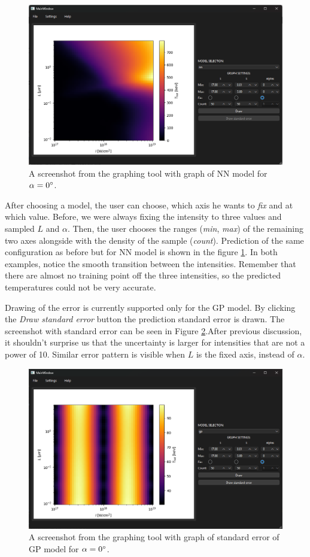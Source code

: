 \begin{figure}[h]
	\centering
	\includegraphics[width=0.80 \textwidth]{figures/graph_tool2}
	\caption{A screenshot from the graphing tool with graph of NN model for $\alpha = 0\degree$.}
	\label{fig:graph-tool2}
\end{figure}


After choosing a model, the user can choose, which axis he wants to \textit{fix} and at which value. Before, we were always fixing the intensity to three values and sampled $L$ and $\alpha$. Then, the user chooses the ranges (\textit{min}, \textit{max}) of the remaining two axes alongside with the density of the sample (\textit{count}). Prediction of the same configuration as before but for NN model is shown in the figure \ref{fig:graph-tool2}. In both examples, notice the smooth transition between the intensities. Remember that there are almost no training point off the three intensities, so the predicted temperatures could not be very accurate.

Drawing of the error is currently supported only for the GP model. By clicking the \textit{Draw standard error} button the prediction standard error is drawn. The screenshot with standard error can be seen in Figure \ref{fig:graph-tool3}.After previous discussion, it shouldn't surprise us that the uncertainty is larger for intensities that are not a power of 10. Similar error pattern is visible when $L$ is the fixed axis, instead of $\alpha$.
\begin{figure}[h]
	\centering
	\includegraphics[width=0.80 \textwidth]{figures/graph_tool3}
	\caption{A screenshot from the graphing tool with graph of standard error of GP model for $\alpha = 0\degree$.}
	\label{fig:graph-tool3}
\end{figure}

